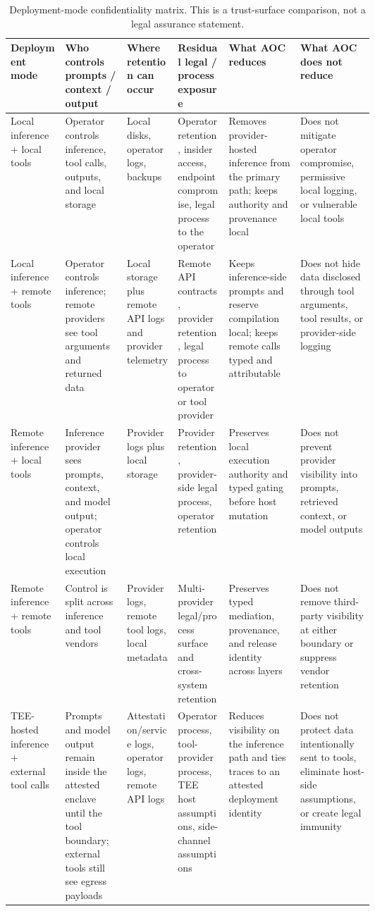 \documentclass[11pt]{article}
\theoremstyle{remark}
\newcommand{\AOC}{\textup{\textsc{AOC}}}
\begin{document}
\begin{table}[H]
\centering
\caption{Deployment-mode confidentiality matrix. This is a trust-surface comparison, not a legal assurance statement.}
\label{tab:confidentiality-matrix}
\footnotesize
\begin{tabularx}{\linewidth}{@{}>{\raggedright\arraybackslash}p{0.15\linewidth}>{\raggedright\arraybackslash}p{0.17\linewidth}>{\raggedright\arraybackslash}p{0.14\linewidth}>{\raggedright\arraybackslash}p{0.14\linewidth}XX@{}}
\toprule
\textbf{Deployment mode} & \textbf{Who controls prompts / context / output} & \textbf{Where retention can occur} & \textbf{Residual legal / process exposure} & \textbf{What \AOC{} reduces} & \textbf{What \AOC{} does not reduce} \\
\midrule
Local inference + local tools & Operator controls inference, tool calls, outputs, and local storage & Local disks, operator logs, backups & Operator retention, insider access, endpoint compromise, legal process to the operator & Removes provider-hosted inference from the primary path; keeps authority and provenance local & Does not mitigate operator compromise, permissive local logging, or vulnerable local tools \\
\addlinespace
Local inference + remote tools & Operator controls inference; remote providers see tool arguments and returned data & Local storage plus remote API logs and provider telemetry & Remote API contracts, provider retention, legal process to operator or tool provider & Keeps inference-side prompts and reserve compilation local; keeps remote calls typed and attributable & Does not hide data disclosed through tool arguments, tool results, or provider-side logging \\
\addlinespace
Remote inference + local tools & Inference provider sees prompts, context, and model output; operator controls local execution & Provider logs plus local storage & Provider retention, provider-side legal process, operator retention & Preserves local execution authority and typed gating before host mutation & Does not prevent provider visibility into prompts, retrieved context, or model outputs \\
\addlinespace
Remote inference + remote tools & Control is split across inference and tool vendors & Provider logs, remote tool logs, local metadata & Multi-provider legal/process surface and cross-system retention & Preserves typed mediation, provenance, and release identity across layers & Does not remove third-party visibility at either boundary or suppress vendor retention \\
\addlinespace
TEE-hosted inference + external tool calls & Prompts and model output remain inside the attested enclave until the tool boundary; external tools still see egress payloads & Attestation/service logs, operator logs, remote API logs & Operator process, tool-provider process, TEE host assumptions, side-channel assumptions & Reduces visibility on the inference path and ties traces to an attested deployment identity & Does not protect data intentionally sent to tools, eliminate host-side assumptions, or create legal immunity \\
\bottomrule
\end{tabularx}
\end{table}
\end{document}
